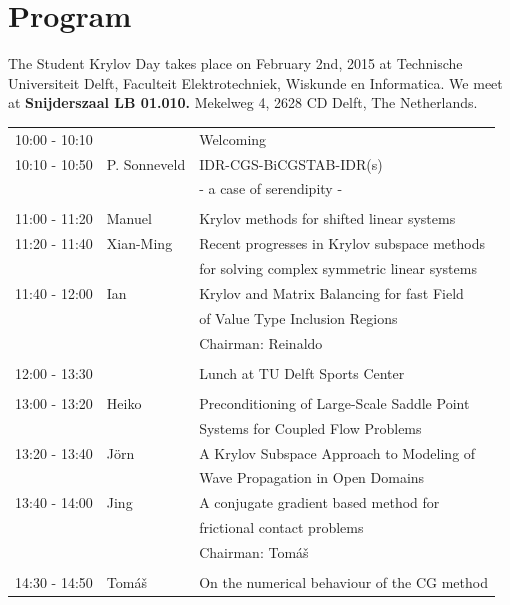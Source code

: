 \documentclass{article}
\begin{document}
\section*{Program}
The Student Krylov Day takes place on February 2nd, 2015 at Technische Universiteit Delft, 
    Faculteit Elektrotechniek, Wiskunde en Informatica. We meet at \textbf{Snijderszaal LB 01.010.}
Mekelweg 4, 2628 CD Delft, The Netherlands. \\ 
\begin{table}[h]
\begin{tabular}{lll}
10:00 - 10:10 &  & Welcoming \\ [0.5ex]
10:10 - 10:50 & P. Sonneveld & IDR-CGS-BiCGSTAB-IDR(s) \\
 & & - a case of serendipity -\\ [0.5ex]
\hline \\ [-1.5ex]
11:00 - 11:20 & Manuel & Krylov methods for shifted linear systems \\ [0.5ex]
11:20 - 11:40 & Xian-Ming & Recent progresses in Krylov subspace methods\\ 
                        & & for solving complex symmetric linear systems\\  [0.5ex]
11:40 - 12:00 & Ian & Krylov and Matrix Balancing for fast Field \\ 
              &     & of Value Type Inclusion Regions\\  [0.5ex]
& & \hfill \small{Chairman: Reinaldo }  \\
\hline \\ [-1.5ex]
12:00 - 13:30 & & Lunch at TU Delft Sports Center \\ [0.5ex]
\hline \\ [-1.5ex]
13:00 - 13:20 & Heiko & Preconditioning of Large-Scale Saddle Point \\
                    & & Systems for Coupled Flow Problems\\ [0.5ex]
13:20 - 13:40 &J\"orn & A Krylov Subspace Approach to Modeling of \\
                     & & Wave Propagation in Open Domains\\ [0.5ex]
13:40 - 14:00 & Jing & A conjugate gradient based method for \\
                   & & frictional contact problems\\ [0.5ex]
& & \hfill \small{Chairman: Tom{\'a}{\v s}} \\
\hline \\ [-1.5ex]
14:30 - 14:50 & Tom{\'a}{\v s} & On the numerical behaviour of the CG method\\ [0.5ex]

\end{tabular}
\end{table}
\end{document}
